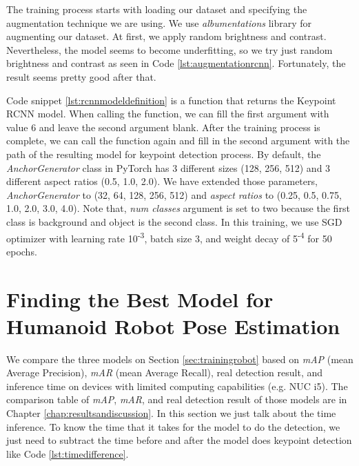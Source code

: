 The training process starts with loading our dataset and specifying the augmentation technique we are using. We use \emph{albumentations} library for augmenting our dataset.
At first, we apply random brightness and contrast. Nevertheless, the model seems to become underfitting, so we try just random brightness and contrast as seen in Code \ref{lst:augmentationrcnn}. 
Fortunately, the result seems pretty good after that.



Code snippet \ref{lst:rcnnmodeldefinition} is a function that returns the Keypoint RCNN model.
When calling the function, we can fill the first argument with value 6
and leave the second argument blank. After the training process is complete, we can call the function again and fill in the second argument with the path of the resulting model for keypoint detection process.
By default, the \emph{AnchorGenerator} class in PyTorch has 3 different sizes (128, 256, 512) and 3 different aspect ratios (0.5, 1.0, 2.0).
We have extended those parameters, \emph{AnchorGenerator} to (32, 64, 128, 256, 512) and \emph{aspect ratios} to (0.25, 0.5, 0.75, 1.0, 2.0, 3.0, 4.0).
Note that, \emph{num classes} argument is set to two because the first class is background and object is the second class.
In this training, we use SGD optimizer with learning rate 10\textsuperscript{-3}, batch size 3, and weight decay of 5\textsuperscript{-4} for 50 epochs.




\section{Finding the Best Model for Humanoid Robot Pose Estimation}
\label{sec:findingbestmodelhumanoidrobot}

We compare the three models on Section \ref{sec:trainingrobot} based on \emph{mAP} (mean Average Precision), \emph{mAR} (mean Average Recall),
real detection result, and inference time on devices with limited computing capabilities (e.g. NUC i5).
The comparison table of \emph{mAP}, \emph{mAR}, and real detection result of those models are in Chapter \ref{chap:resultsandiscussion}. In this section we just talk about the time inference.
To know the time that it takes for the model to do the detection, we just need to subtract the time before and after the model does keypoint detection like Code \ref{lst:timedifference}.


